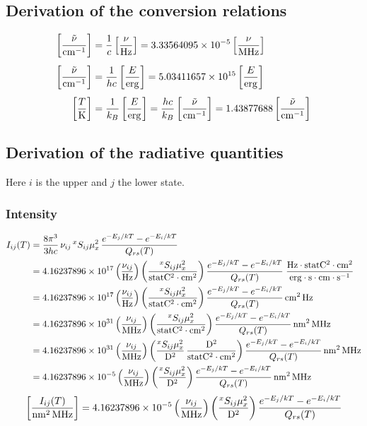\subsection{Derivation of the conversion relations}\label{app:a}
\begin{align*}
  \left[\frac{\tilde\nu}{\mathrm{cm^{-1}}}\right] &= \frac1c\left[\frac{\nu}{\mathrm{Hz}}\right]
                               = 3.33564095\times10^{-5}\left[\frac{\nu}{\mathrm{MHz}}\right]\\[4pt]
  \left[\frac{\tilde\nu}{\mathrm{cm^{-1}}}\right] &= \frac1{hc}\left[\frac{E}{\mathrm{erg}}\right]
                               = 5.03411657\times10^{15}\left[\frac{E}{\mathrm{erg}}\right]\\[4pt]
  \left[\frac{T}{\mathrm{K}}\right] &= \frac1{k_B}\left[\frac{E}{\mathrm{erg}}\right]
                 = \frac{hc}{k_B}\left[\frac{\tilde\nu}{\mathrm{cm^{-1}}}\right]
                 = 1.43877688\left[\frac{\tilde\nu}{\mathrm{cm^{-1}}}\right]
\end{align*}

\subsection{Derivation of the radiative quantities}\label{app:b}
Here $i$ is the upper and $j$ the lower state.

\subsubsection*{Intensity}
\begin{align*}
  I_{ij}(T) &= \frac{8\pi^3}{3hc}\,\nu_{ij}\,{}^{x}S_{ij}\mu_x^2\,
               \frac{e^{-E_j/kT}-e^{-E_i/kT}}{Q_{rs}(T)}\\
  &= 4.16237896\times10^{17}
     \left(\frac{\nu_{ij}}{\mathrm{Hz}}\right)
     \left(\frac{{}^{x}S_{ij}\mu_x^2}{\mathrm{statC^2\cdot cm^2}}\right)
     \frac{e^{-E_j/kT}-e^{-E_i/kT}}{Q_{rs}(T)}\;
     \frac{\mathrm{Hz\cdot statC^2\cdot cm^2}}{\mathrm{erg\cdot s\cdot cm\cdot s^{-1}}}\\
  &= 4.16237896\times10^{17}
     \left(\frac{\nu_{ij}}{\mathrm{Hz}}\right)
     \left(\frac{{}^{x}S_{ij}\mu_x^2}{\mathrm{statC^2\cdot cm^2}}\right)
     \frac{e^{-E_j/kT}-e^{-E_i/kT}}{Q_{rs}(T)}\,\mathrm{cm^2\,Hz}\\
  &= 4.16237896\times10^{31}
     \left(\frac{\nu_{ij}}{\mathrm{MHz}}\right)
     \left(\frac{{}^{x}S_{ij}\mu_x^2}{\mathrm{statC^2\cdot cm^2}}\right)
     \frac{e^{-E_j/kT}-e^{-E_i/kT}}{Q_{rs}(T)}\,\mathrm{nm^2\,MHz}\\
  &= 4.16237896\times10^{31}
     \left(\frac{\nu_{ij}}{\mathrm{MHz}}\right)
     \left(\frac{{}^{x}S_{ij}\mu_x^2}{\mathrm{D^2}}\,
           \frac{\mathrm{D^2}}{\mathrm{statC^2\cdot cm^2}}\right)
     \frac{e^{-E_j/kT}-e^{-E_i/kT}}{Q_{rs}(T)}\,\mathrm{nm^2\,MHz}\\
  &= 4.16237896\times10^{-5}
     \left(\frac{\nu_{ij}}{\mathrm{MHz}}\right)
     \left(\frac{{}^{x}S_{ij}\mu_x^2}{\mathrm{D^2}}\right)
     \frac{e^{-E_j/kT}-e^{-E_i/kT}}{Q_{rs}(T)}\,\mathrm{nm^2\,MHz}
\end{align*}
\begin{equation*}
  \left[\frac{I_{ij}(T)}{\mathrm{nm^2\,MHz}}\right] = 4.16237896\times10^{-5}
     \left(\frac{\nu_{ij}}{\mathrm{MHz}}\right)
     \left(\frac{{}^{x}S_{ij}\mu_x^2}{\mathrm{D^2}}\right)
     \frac{e^{-E_j/kT}-e^{-E_i/kT}}{Q_{rs}(T)}
\end{equation*}


